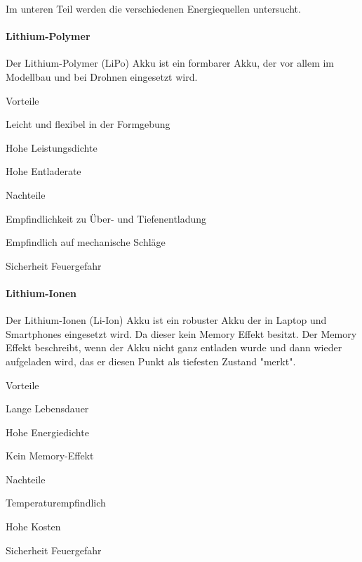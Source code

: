 \documentclass[../main.tex]{subfiles}
\begin{document}
Im unteren Teil werden die verschiedenen Energiequellen untersucht.

\paragraph{Lithium-Polymer}
Der Lithium-Polymer (LiPo) Akku ist ein formbarer Akku, der vor allem im Modellbau und bei Drohnen eingesetzt wird.
 

\begin{minipage}[t]{0.48\textwidth}
\begin{items}
  \item [Vorteile]
  \item Leicht und flexibel in der Formgebung
  \item Hohe Leistungsdichte
  \item Hohe Entladerate
\end{items}
\end{minipage}
\hfill
\begin{minipage}[t]{0.48\textwidth}
\begin{items}
  \item [Nachteile]
  \item Empfindlichkeit zu Über- und Tiefenentladung
  \item Empfindlich auf mechanische Schläge
  \item Sicherheit Feuergefahr
\end{items}
\end{minipage}


\paragraph{Lithium-Ionen}

Der Lithium-Ionen (Li-Ion) Akku ist ein robuster Akku der in Laptop und Smartphones eingesetzt wird. Da dieser kein Memory Effekt besitzt. Der Memory Effekt beschreibt, wenn der Akku nicht ganz entladen wurde und dann wieder aufgeladen wird, das er diesen Punkt als tiefesten Zustand "merkt".

\begin{minipage}[t]{0.48\textwidth}
\begin{items}
  \item [Vorteile]
  \item Lange Lebensdauer
  \item Hohe Energiedichte
  \item Kein Memory-Effekt
\end{items}
\end{minipage}
\hfill
\begin{minipage}[t]{0.48\textwidth}
\begin{items}
  \item [Nachteile]
  \item Temperaturempfindlich
  \item Hohe Kosten
  \item Sicherheit Feuergefahr
\end{items}
\end{minipage}
 
\end{document}
